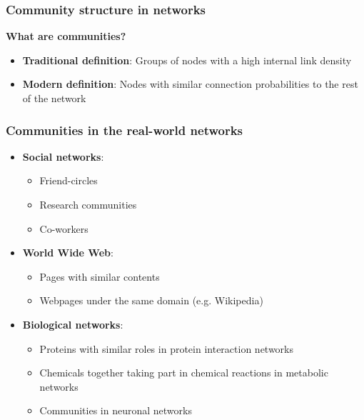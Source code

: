 \documentclass{beamer}
\begin{document}
\begin{frame}
    \frametitle{Community structure in networks}
    \centering
    {\bf What are communities?}
    \vspace{2em}
    \begin{itemize}
    \setlength\itemsep{1em}
        \item{{\bf Traditional definition}: Groups of nodes with a high internal link density}
        \item{{\bf Modern definition}: Nodes with similar connection probabilities to the rest of the network}
    \end{itemize}

\end{frame}
\begin{frame}
    \frametitle{Communities in the real-world networks}
    \centering
    \begin{itemize}
    \setlength\itemsep{1em}
        \item{{\bf Social networks}: 
            \begin{itemize}
                \item{Friend-circles}
                \item{Research communities}
                \item{Co-workers}
            \end{itemize}
    }
        \item{{\bf World Wide Web}: 
            \begin{itemize}
                \item{Pages with similar contents}
                \item{Webpages under the same domain (e.g. Wikipedia)}
            \end{itemize}
    }
        \item{{\bf Biological networks}:
            \begin{itemize}
                \item{Proteins with similar roles in protein interaction networks}
                \item{Chemicals together taking part in chemical reactions in metabolic networks}
                \item{Communities in neuronal networks}
            \end{itemize}
}
    \end{itemize}
\end{frame}
\end{document}
